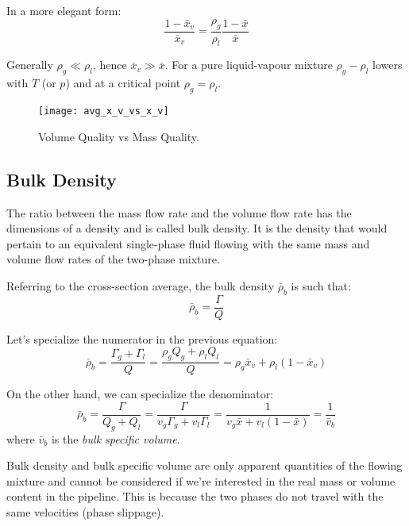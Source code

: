 In a more elegant form:
\begin{equation*}
    \frac{1-\bar{x}_v}{\bar{x}_v} = \frac{\rho_g}{\rho_l}\frac{1-\bar{x}}{\bar{x}}
\end{equation*}

Generally $\rho_g \ll \rho_l$, hence $\bar{x}_v \gg \bar{x}$. For a pure
liquid-vapour mixture $\rho_g-\rho_l$ lowers with $T$ (or $p$) and at a critical
point $\rho_g=\rho_l$.

\begin{figure}[htp]
    \centering
    \texttt{[image: avg\_x\_v\_vs\_x\_v]}
    \caption{Volume Quality vs Mass Quality.}
\end{figure}

\subsection{Bulk Density}
The ratio between the mass flow rate and the volume flow rate has the dimensions
of a density and is called bulk density. It is the density that would pertain to
an equivalent single-phase fluid flowing with the same mass and volume flow
rates of the two-phase mixture.

Referring to the cross-section average, the bulk density $\bar{\rho}_b$ is such
that:
\begin{equation*}
    \bar{\rho}_b = \frac{\Gamma}{Q}
\end{equation*}

Let's specialize the numerator in the previous equation:
\begin{equation*}
    \bar{\rho}_b = \frac{\Gamma_g + \Gamma_l}{Q} = \frac{\rho_g Q_g + \rho_l Q_l}{Q} = \rho_g\bar{x}_v+\rho_l(1-\bar{x}_v)
\end{equation*}

On the other hand, we can specialize the denominator:
\begin{equation*}
    \bar{\rho}_b = \frac{\Gamma}{Q_g+Q_l} = \frac{\Gamma}{v_g\Gamma_g+v_l\Gamma_l} = \frac{1}{v_g\bar{x}+v_l(1-\bar{x})} = \frac{1}{\bar{v}_b}
\end{equation*}
where $\bar{v}_b$ is the \emph{bulk specific volume}.

Bulk density and bulk specific volume are only apparent quantities of the
flowing mixture and cannot be considered if we're interested in the real mass or
volume content in the pipeline. This is because the two phases do not travel
with the same velocities (phase slippage).

